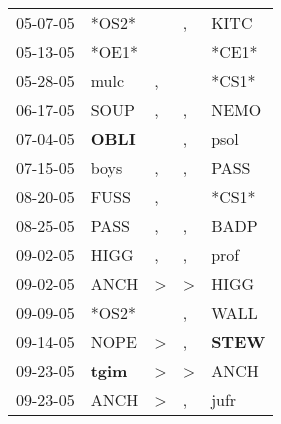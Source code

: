 \begin{supertabular}{p{0.07\textwidth}p{0.06\textwidth}p{0.02\textwidth}p{0.02\textwidth}p{0.06\textwidth}}
          05-07-05\textsuperscript{} &                            *OS2* &                  &                , &           KITC\textsuperscript{} \\
          05-13-05\textsuperscript{} &                            *OE1* &                  &                  &                            *CE1* \\
          05-28-05\textsuperscript{} &           mulc\textsuperscript{} &                , &                  &                            *CS1* \\
          06-17-05\textsuperscript{} &           SOUP\textsuperscript{} &                , &                , &           NEMO\textsuperscript{} \\
          07-04-05\textsuperscript{} &  \textbf{OBLI\textsuperscript{}} &                  &                , &           psol\textsuperscript{} \\
          07-15-05\textsuperscript{} &           boys\textsuperscript{} &                , &                , &           PASS\textsuperscript{} \\
          08-20-05\textsuperscript{} &           FUSS\textsuperscript{} &                , &                  &                            *CS1* \\
          08-25-05\textsuperscript{} &           PASS\textsuperscript{} &                , &                , &           BADP\textsuperscript{} \\
          09-02-05\textsuperscript{} &           HIGG\textsuperscript{} &                , &                , &           prof\textsuperscript{} \\
          09-02-05\textsuperscript{} &           ANCH\textsuperscript{} &     \textgreater &     \textgreater &           HIGG\textsuperscript{} \\
          09-09-05\textsuperscript{} &                            *OS2* &                  &                , &           WALL\textsuperscript{} \\
          09-14-05\textsuperscript{} &           NOPE\textsuperscript{} &     \textgreater &                , &  \textbf{STEW\textsuperscript{}} \\
          09-23-05\textsuperscript{} &  \textbf{tgim\textsuperscript{}} &     \textgreater &     \textgreater &           ANCH\textsuperscript{} \\
          09-23-05\textsuperscript{} &           ANCH\textsuperscript{} &     \textgreater &                , &           jufr\textsuperscript{} \\

\end{supertabular}
